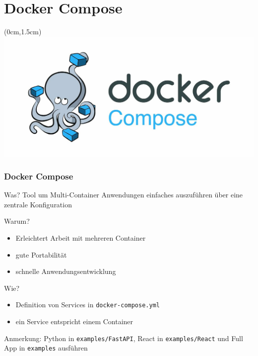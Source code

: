 \documentclass[22pt]{beamer}
\newcommand{\code}[1]{\colorbox{darkgray!20}{\texttt{#1}}}
\begin{document}
\section{Docker Compose}
\begin{frame}[plain]
    \begin{textblock*}{\paperwidth}(0cm,1.5cm) %
        \includegraphics[width=\paperwidth]{Bilder/1200px-Docker-compose-logo.jpg}
    \end{textblock*}
\end{frame}

\begin{frame}[t]
    \frametitle{Docker Compose}
    \begin{block}{Was?}
        Tool um Multi-Container Anwendungen einfaches auszuführen
        über eine zentrale Konfiguration
    \end{block}\pause
    \begin{block}{Warum?}
        \begin{itemize}
            \item Erleichtert Arbeit mit mehreren Container
            \item gute Portabilität
            \item schnelle Anwendungsentwicklung
        \end{itemize}
    \end{block}\pause
    \begin{block}{Wie?}
        \begin{itemize}
            \item Definition von Services in \code{docker-compose.yml}
            \item ein Service entspricht einem Container
        \end{itemize}
    \end{block}
    \medskip
    \footnotesize Anmerkung: Python in \code{examples/FastAPI}, React in \code{examples/React} und Full App in \code{examples} ausführen
\end{frame}
\end{document}

